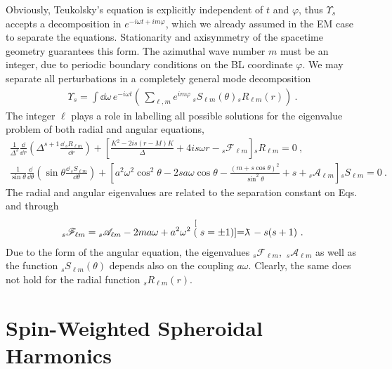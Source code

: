 Obviously, Teukolsky's equation is explicitly independent of $t$ and $\varphi$, thus $\Upsilon_s$ accepts a decomposition in $e^{-i \omega t + i m \varphi}$, which we already assumed in the EM case to separate the equations.
Stationarity and axisymmetry of the spacetime geometry guarantees this form.
The azimuthal wave number $m$ must be an integer, due to periodic boundary conditions on the BL coordinate $\varphi$.
We may separate all perturbations in a completely general mode decomposition
\begin{align}
    \label{eq3:multipoleExpansion}
    \Upsilon_s = \int\dd\omega \, e^{-i \omega t} \left( \,\sum_{\ell,m} e^{i m \varphi} \, {}_{s}S_{\ell m}(\theta) {}_{s}R_{\ell m}(r) \right) ~.
\end{align}
The integer $\ell$ plays a role in labelling all possible solutions for the eigenvalue problem of both radial and angular equations,
\begin{align}
    \label{eq3:teukolskyRadial}
    \frac{1}{\Delta^s} \frac{\dd}{\dd r} \left( \Delta^{s+1} \frac{\dd\, {}_{s}R_{\ell m}}{\dd r} \right)
    + \left[ \frac{K^2 - 2 i s (r-M)K}{\Delta} + 4 i s \omega r -{}_{s}\mathscr{F}_{\ell m}  \right] {}_{s}R_{\ell m} = 0 ~, \\[0.15cm]
    \label{eq3:teukolskyAngular}
    \frac{1}{\sin\theta} \frac{\dd}{\dd\theta} \left( \sin\theta \frac{\dd\, {}_{s}S_{\ell m}}{\dd \theta} \right)
    + \left[ a^2 \omega^2 \cos^2\theta - 2 s a \omega \cos\theta - \frac{(m + s \cos\theta)^2}{\sin^2\theta} + s + {}_{s}\mathscr{A}_{\ell m} \right] {}_{s}S_{\ell m}  = 0~.
\end{align}
The radial and angular eigenvalues are related to the separation constant on Eqs.  and  through
\begin{align}
    {}_{s}\mathscr{F}_{\ell m} = {}_{s}\mathscr{A}_{\ell m} - 2 m a \omega + a^2 \omega^2 \stackrel[(s=\pm 1)]{}{=} \lambdabar - s(s+1) ~.
    \label{eq3:relationEVs}
\end{align}
Due to the form of the angular equation, the eigenvalues ${}_{s}\mathscr{F}_{\ell m}$, \,${}_{s}\mathscr{A}_{\ell m}$ as well as the function ${}_{s}S_{\ell m}(\theta)$ depends also on the coupling $a \omega$.
Clearly, the same does not hold for the radial function ${}_{s}R_{\ell m}(r)$. 


\section{Spin-Weighted Spheroidal Harmonics}

